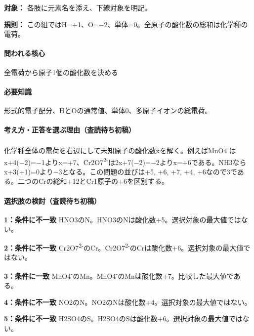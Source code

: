\noindent\textbf{対象：} 各肢に元素名を添え、下線対象を明記。\par

\noindent\textbf{規則：} この組ではH=+1、O=−2、単体=0。全原子の酸化数の総和は化学種の電荷。\par

\paragraph{問われる核心} 全電荷から原子1個の酸化数を決める

\paragraph{必要知識} 形式的電子配分、HとOの通常値、単体0、多原子イオンの総電荷。

\paragraph{考え方・正答を選ぶ理由（査読待ち初稿）} 化学種全体の電荷を右辺にして未知原子の酸化数xを解く。例えばMnO4\textsuperscript{-}はx+4(−2)=−1よりx=+7、Cr2O7\textsuperscript{2-}は2x+7(−2)=−2よりx=+6である。NH3ならx+3(+1)=\allowbreak{}0より−3となる。この問題の並びは+5, +6, +7, +4, +6なので3である。二つのCrの総和+12とCr1原子の+6を区別する。

\paragraph{選択肢の検討（査読待ち初稿）}\mbox{}\par

\noindent\textbf{1：条件に不一致} HNO3のN。HNO3のNは酸化数+5。選択対象の最大値ではない。\par

\noindent\textbf{2：条件に不一致} Cr2O7\textsuperscript{2-}のCr。Cr2O7\textsuperscript{2-}のCrは酸化数+6。選択対象の最大値ではない。\par

\noindent\textbf{3：条件に一致} MnO4\textsuperscript{-}のMn。MnO4\textsuperscript{-}のMnは酸化数+7。比較した最大値である。\par

\noindent\textbf{4：条件に不一致} NO2のN。NO2のNは酸化数+4。選択対象の最大値ではない。\par

\noindent\textbf{5：条件に不一致} H2SO4のS。H2SO4のSは酸化数+6。選択対象の最大値ではない。\par

